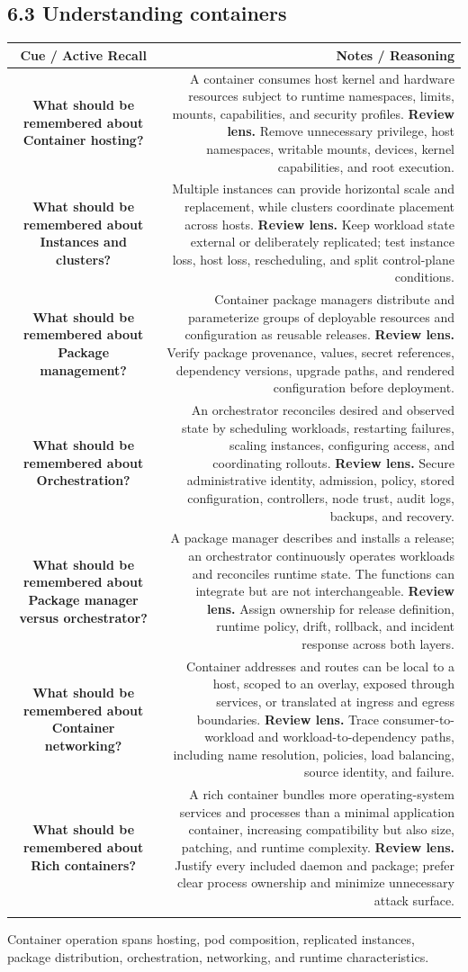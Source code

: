 \documentclass[11pt]{article}
\newcommand{\CornellHeader}{\rowcolor{Navy}\color{white}\bfseries Cue / Active Recall & \color{white}\bfseries Notes / Reasoning \\\endhead}
\newcommand{\CornellRow}[2]{\cellcolor{CueGray}\textbf{#1} & #2 \\\addlinespace[3pt]}
\begin{document}
\subsection{6.3 Understanding containers}
\begin{longtable}{@{}C N@{}}
\CornellHeader
\CornellRow{What should be remembered about Container hosting?}{A container consumes host kernel and hardware resources subject to runtime namespaces, limits, mounts, capabilities, and security profiles. \textbf{Review lens.} Remove unnecessary privilege, host namespaces, writable mounts, devices, kernel capabilities, and root execution.}
\CornellRow{What should be remembered about Instances and clusters?}{Multiple instances can provide horizontal scale and replacement, while clusters coordinate placement across hosts. \textbf{Review lens.} Keep workload state external or deliberately replicated; test instance loss, host loss, rescheduling, and split control-plane conditions.}
\CornellRow{What should be remembered about Package management?}{Container package managers distribute and parameterize groups of deployable resources and configuration as reusable releases. \textbf{Review lens.} Verify package provenance, values, secret references, dependency versions, upgrade paths, and rendered configuration before deployment.}
\CornellRow{What should be remembered about Orchestration?}{An orchestrator reconciles desired and observed state by scheduling workloads, restarting failures, scaling instances, configuring access, and coordinating rollouts. \textbf{Review lens.} Secure administrative identity, admission, policy, stored configuration, controllers, node trust, audit logs, backups, and recovery.}
\CornellRow{What should be remembered about Package manager versus orchestrator?}{A package manager describes and installs a release; an orchestrator continuously operates workloads and reconciles runtime state. The functions can integrate but are not interchangeable. \textbf{Review lens.} Assign ownership for release definition, runtime policy, drift, rollback, and incident response across both layers.}
\CornellRow{What should be remembered about Container networking?}{Container addresses and routes can be local to a host, scoped to an overlay, exposed through services, or translated at ingress and egress boundaries. \textbf{Review lens.} Trace consumer-to-workload and workload-to-dependency paths, including name resolution, policies, load balancing, source identity, and failure.}
\CornellRow{What should be remembered about Rich containers?}{A rich container bundles more operating-system services and processes than a minimal application container, increasing compatibility but also size, patching, and runtime complexity. \textbf{Review lens.} Justify every included daemon and package; prefer clear process ownership and minimize unnecessary attack surface.}
\end{longtable}
\begin{sectionsummarybox}
Container operation spans hosting, pod composition, replicated instances, package distribution, orchestration, networking, and runtime characteristics.
\end{sectionsummarybox}
\end{document}

